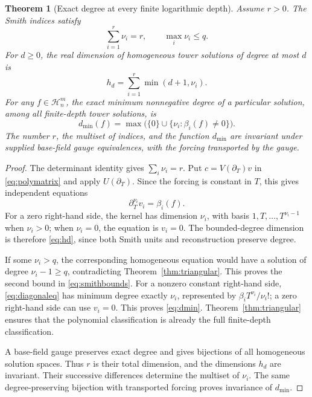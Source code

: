 \documentclass[11pt,a4paper]{article}
\numberwithin{equation}{section}
\newtheorem{theorem}{Theorem}[section]
\theoremstyle{definition}
\theoremstyle{remark}\newtheorem{remark}[theorem]{Remark}
\newcommand{\Hh}{\mathcal H}\newcommand{\Ll}{\mathcal L}
\newcommand{\dd}{\partial_T}\newcommand{\eps}{\varepsilon}
\begin{document}
\begin{theorem}[Exact degree at every finite logarithmic depth]
\label{thm:smith}
Assume $r>0$. The Smith indices satisfy
\begin{equation}
 \sum_{i=1}^r\nu_i=r,\qquad \max_i\nu_i\le q.
 \label{eq:smithbounds}
\end{equation}
For $d\ge0$, the real dimension of homogeneous tower solutions of degree at most $d$ is
\begin{equation}
 h_d=\sum_{i=1}^r\min(d+1,\nu_i).
 \label{eq:hd}
\end{equation}
For any $f\in\Hh_n^m$, the exact minimum nonnegative degree of a particular solution, among all finite-depth tower solutions, is
\begin{equation}
 d_{\min}(f)=\max\bigl(\{0\}\cup
       \{\nu_i:\beta_i(f)\ne0\}\bigr).
 \label{eq:dmin}
\end{equation}
The number $r$, the multiset of indices, and the function $d_{\min}$ are invariant under supplied base-field gauge equivalences, with the forcing transported by the gauge.
\end{theorem}
\begin{proof}
The determinant identity gives $\sum_i\nu_i=r$. Put $c=V(\dd)v$ in \eqref{eq:polymatrix} and apply $U(\dd)$. Since the forcing is constant in $T$, this gives independent equations
\begin{equation}
 \dd^{\nu_i}v_i=\beta_i(f).
 \label{eq:diagonaleq}
\end{equation}
For a zero right-hand side, the kernel has dimension $\nu_i$, with basis $1,T,\ldots,T^{\nu_i-1}$ when $\nu_i>0$; when $\nu_i=0$, the equation is $v_i=0$. The bounded-degree dimension is therefore \eqref{eq:hd}, since both Smith units and reconstruction preserve degree.

If some $\nu_i>q$, the corresponding homogeneous equation would have a solution of degree $\nu_i-1\ge q$, contradicting Theorem~\ref{thm:triangular}. This proves the second bound in \eqref{eq:smithbounds}. For a nonzero constant right-hand side, \eqref{eq:diagonaleq} has minimum degree exactly $\nu_i$, represented by $\beta_iT^{\nu_i}/\nu_i!$; a zero right-hand side can use $v_i=0$. This proves \eqref{eq:dmin}. Theorem~\ref{thm:triangular} ensures that the polynomial classification is already the full finite-depth classification.

A base-field gauge preserves exact degree and gives bijections of all homogeneous solution spaces. Thus $r$ is their total dimension, and the dimensions $h_d$ are invariant. Their successive differences determine the multiset of $\nu_i$. The same degree-preserving bijection with transported forcing proves invariance of $d_{\min}$.
\end{proof}
\end{document}
